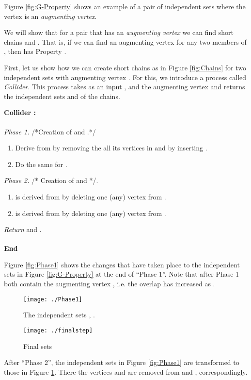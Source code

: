 \documentclass[a4paper,10pt]{article}
\begin{document}
\noindent
Figure \ref{fig:G-Property} shows an example of a pair of independent
sets where the vertex  is an {\em augmenting vertex}. 


We will show that for a pair 
that has an {\em augmenting vertex } we can find short chains
  and  . That is,
if we can find an augmenting vertex for any two members of ,
then  has Property .


First, let us show how  we can create  short chains as in
Figure \ref{fig:Chains} for two independent sets 
with augmenting vertex . For this, we introduce a process
called {\em Collider}.  This process takes as an input , 
  and the augmenting vertex   and returns the independent
sets  and  of the chains. \\ \vspace{-.3cm}

\noindent
{\bf Collider :} 
\\ \vspace{-.3cm}\\
{\em  Phase 1.} \hspace*{0.5cm} /*Creation of  and .*/ \vspace{-.1cm} 
\begin{enumerate}
\item Derive  from  by removing the all its vertices in 
and by inserting .
	\item Do the same for . 
\end{enumerate}
{\em  Phase 2.} \hspace*{0.5cm} /* Creation of  and */. \vspace{-.1cm}
\begin{enumerate}
	\item  is derived from  by deleting one  (any) vertex
	from .
	\item  is derived from  by deleting one  (any) vertex 
	from .
\end{enumerate}
 {\em Return}   and .\\ \vspace{-.3cm}\\
{\bf End}\\ \vspace{-.3cm}

\noindent
Figure \ref{fig:Phase1} shows the changes that have taken place 
to the independent sets in Figure \ref{fig:G-Property} at the 
end of ``Phase 1''. Note that after Phase 1 both  contain the 
augmenting vertex , i.e. the overlap has increased as 
.
\begin{figure}
\begin{minipage}{0.5\textwidth}
	\centering
		\texttt{[image: ./Phase1]}
	\caption{The independent sets , . }
	\label{fig:Phase1}
\end{minipage}
\begin{minipage}{0.5\textwidth}
	\centering
		\texttt{[image: ./finalstep]}
	\caption{Final sets }
	\label{fig:finalstep}
\end{minipage}
\end{figure}
After ``Phase 2'', the independent sets in  Figure \ref{fig:Phase1}
are transformed to those in Figure \ref{fig:finalstep}. There the
vertices  and  are removed from  and ,
correspondingly.
\end{document}
